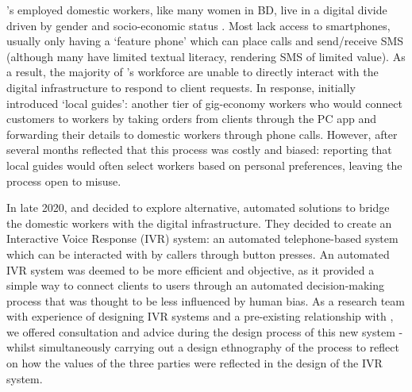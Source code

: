 \PC{}'s employed domestic workers, like many women in BD, live in a digital divide driven by gender and socio-economic status \cite{Genilo2015}. Most lack access to smartphones, usually only having a `feature phone' which can place calls and send/receive SMS (although many have limited textual literacy, rendering SMS of limited value). As a result, the majority of \PC{}'s workforce are unable to directly interact with the digital infrastructure to respond to client requests. In response, \PC{} initially introduced `local guides': another tier of gig-economy workers who would connect customers to workers by taking orders from clients through the PC app and forwarding their details to domestic workers through phone calls. However, after several months \PC{} reflected that this process was costly and biased: reporting that local guides would often select workers based on personal preferences, leaving the process open to misuse. 

In late 2020, \PC{} and \NGO{} decided to explore alternative, automated solutions to bridge the domestic workers with the digital infrastructure. They decided to create an Interactive Voice Response (IVR) system: an automated telephone-based system which can be interacted with by callers through button presses. An automated IVR system was deemed to be more efficient and objective, as it provided a simple way to connect clients to users through an automated decision-making process that was thought to be less influenced by human bias. As a research team with experience of designing IVR systems and a pre-existing relationship with \NGO{}, we offered consultation and advice during the design process of this new system - whilst simultaneously carrying out a design ethnography of the process to reflect on how the values of the three parties were reflected in the design of the IVR system. 